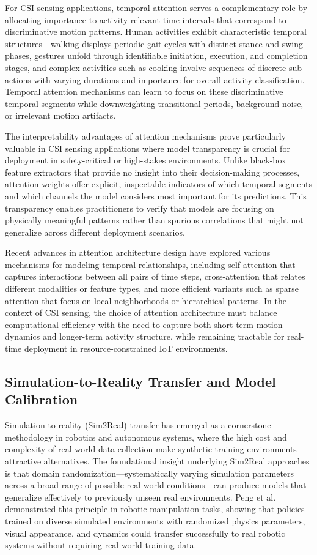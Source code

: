 \documentclass[journal]{IEEEtran}
\begin{document}
For CSI sensing applications, temporal attention serves a complementary role by allocating importance to activity-relevant time intervals that correspond to discriminative motion patterns. Human activities exhibit characteristic temporal structures—walking displays periodic gait cycles with distinct stance and swing phases, gestures unfold through identifiable initiation, execution, and completion stages, and complex activities such as cooking involve sequences of discrete sub-actions with varying durations and importance for overall activity classification. Temporal attention mechanisms can learn to focus on these discriminative temporal segments while downweighting transitional periods, background noise, or irrelevant motion artifacts.

The interpretability advantages of attention mechanisms prove particularly valuable in CSI sensing applications where model transparency is crucial for deployment in safety-critical or high-stakes environments. Unlike black-box feature extractors that provide no insight into their decision-making processes, attention weights offer explicit, inspectable indicators of which temporal segments and which channels the model considers most important for its predictions. This transparency enables practitioners to verify that models are focusing on physically meaningful patterns rather than spurious correlations that might not generalize across different deployment scenarios.

Recent advances in attention architecture design have explored various mechanisms for modeling temporal relationships, including self-attention that captures interactions between all pairs of time steps, cross-attention that relates different modalities or feature types, and more efficient variants such as sparse attention that focus on local neighborhoods or hierarchical patterns. In the context of CSI sensing, the choice of attention architecture must balance computational efficiency with the need to capture both short-term motion dynamics and longer-term activity structure, while remaining tractable for real-time deployment in resource-constrained IoT environments.

\subsection{Simulation-to-Reality Transfer and Model Calibration}

Simulation-to-reality (Sim2Real) transfer has emerged as a cornerstone methodology in robotics and autonomous systems, where the high cost and complexity of real-world data collection make synthetic training environments attractive alternatives. The foundational insight underlying Sim2Real approaches is that domain randomization—systematically varying simulation parameters across a broad range of possible real-world conditions—can produce models that generalize effectively to previously unseen real environments. Peng et al.~\cite{peng2018sim2real} demonstrated this principle in robotic manipulation tasks, showing that policies trained on diverse simulated environments with randomized physics parameters, visual appearance, and dynamics could transfer successfully to real robotic systems without requiring real-world training data.
\end{document}
